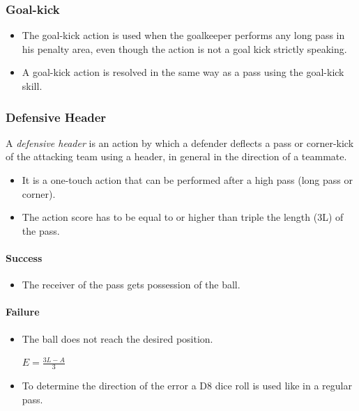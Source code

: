\documentclass[12pt]{article}
\begin{document}
\subsubsection{Goal-kick}
\begin{rulebox}
\begin{itemize}
\item The goal-kick action is used when the goalkeeper performs any long pass in his penalty area, even though the action is not a goal kick strictly speaking.
\item A goal-kick action is resolved in the same way as a pass using the goal-kick skill.
\end{itemize}
\end{rulebox}

\subsubsection{Defensive Header}
A \emph{defensive header} is an action by which a defender deflects a pass or corner-kick of the attacking team using a header, in general in the direction of a teammate.

\begin{rulebox}
\begin{itemize}
\item It is a one-touch action that can be performed after a high pass (long pass or corner).
\item The action score has to be equal to or higher than triple the length (3L) of the pass.
\end{itemize}
\end{rulebox}

\paragraph{Success}

\begin{rulebox}
\begin{itemize}
\item The receiver of the pass gets possession of the ball.
\end{itemize}
\end{rulebox}

\paragraph{Failure}

\begin{rulebox}
\begin{itemize}
\item The ball does not reach the desired position.
\begin{formulabox}
$E = \frac{3L - A}{3}$
\end{formulabox}
\item To determine the direction of the error a D8 dice roll is used like in a regular pass.
\end{itemize}
\end{rulebox}
\end{document}

